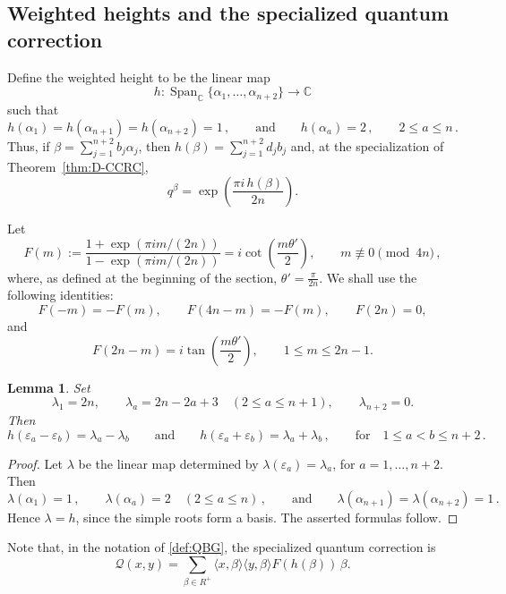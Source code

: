 \documentclass[a4paper,reqno]{amsart}
\theoremstyle{plain} %
\newtheorem{lmm}[thm]{Lemma}
\theoremstyle{definition} %
\theoremstyle{remark} %
\newcommand{\1}{\mathds{1}}   %
\begin{document}
\subsection{Weighted heights and the specialized quantum correction}


Define the weighted height to be the linear map
\[
h:
\operatorname{Span}_{\mathbb C}
\{\alpha_1,\ldots,\alpha_{n+2}\}
\longrightarrow\mathbb C
\]
such that
\[
h(\alpha_1)
=
h(\alpha_{n+1})
=
h(\alpha_{n+2})
=
1\, , \qquad \mbox{and} \qquad h(\alpha_a)=2 \, , \qquad 2\le a\le n \, .
\]
Thus, if $\beta=\sum_{j=1}^{n+2}b_j\alpha_j$, then $h(\beta) = \sum_{j=1}^{n+2}d_jb_j$ and, 
at the specialization of Theorem~\ref{thm:D-CCRC},
\[
q^\beta
=
\exp\left(\frac{\pi i\,h(\beta)}{2n}\right).
\]

Let
\begin{equation}\label{DefF}
F(m)
:=
\frac{1+\exp(\pi i m/(2n))}
     {1-\exp(\pi i m/(2n))}
=
i\cot\left(\frac{m\theta'}{2}\right),
\qquad
m\not\equiv0\pmod{4n} \, ,
\end{equation}
where, as defined at the beginning of the section, $\theta'=\frac{\pi}{2n}$.
We shall use the following identities:
\[
F(-m)=-F(m),
\qquad
F(4n-m)=-F(m), \qquad
F(2n)=0,
\]
and
\[
F(2n-m)
=
i\tan\left(\frac{m\theta'}{2}\right),
\qquad
1\le m\le2n-1.
\]



\begin{lmm}\label{lem:D-height}
Set
\[
\lambda_1=2n,
\qquad
\lambda_a=2n-2a+3
\quad(2\le a\le n+1),
\qquad
\lambda_{n+2}=0.
\]
Then
\[
h(\varepsilon_a-\varepsilon_b)
=
\lambda_a-\lambda_b \qquad \mbox{and} \qquad h(\varepsilon_a+\varepsilon_b) = \lambda_a+\lambda_b \, , 
\qquad \mbox{for} \quad 1\le a<b\le n+2 \, .
\]
\end{lmm}

\begin{proof}
Let \(\lambda\) be the linear map determined by $\lambda(\varepsilon_a)=\lambda_a$, for $a=1, \ldots , n+2$.
Then
\[
\lambda(\alpha_1)=1 \, ,
\qquad
\lambda(\alpha_a)=2
\quad(2\le a\le n) \, , \qquad \mbox{and} \qquad \lambda(\alpha_{n+1}) = \lambda(\alpha_{n+2}) = 1 \, .
\]
Hence \(\lambda=h\), since the simple roots form a basis.
The asserted formulas follow.
\end{proof}


Note that, in the notation of \eqref{def:QBG}, the specialized quantum correction is
\begin{equation}\label{eq:D-Q}
\mathcal Q(x,y)
=
\sum_{\beta\in R^+}
\langle x,\beta\rangle
\langle y,\beta\rangle
F(h(\beta))\,\beta .
\end{equation}
\end{document}
